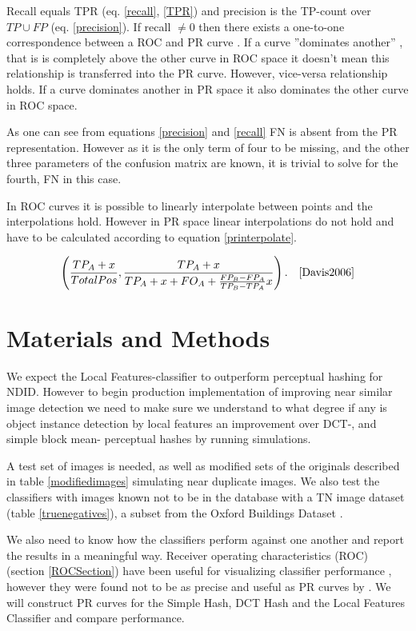 \documentclass[english,12pt,a4paper,pdftex,elec,utf8]{aaltothesis}
\begin{document}
Recall equals TPR (eq. \ref{recall}, \ref{TPR}) and precision is the TP-count over $TP \cup FP$ (eq. \ref{precision}). If recall $\neq 0$ then there exists a one-to-one correspondence between a ROC and PR curve \cite{Davis2006}. If a curve ''dominates another'' \cite{Provost1997}, that is is completely above the other curve in ROC space it doesn't mean this relationship is transferred into the PR curve. However, vice-versa relationship holds. If a curve dominates another in PR space it also dominates the other curve in ROC space. \cite{Davis2006}

As one can see from equations \ref{precision} and \ref{recall} FN is absent from the PR representation. However as it is the only term of four to be missing, and the other three parameters of the confusion matrix are known, it is trivial to solve for the fourth, FN in this case. \cite{Davis2006}

In ROC curves it is possible to linearly interpolate between points and the interpolations hold. However in PR space linear interpolations do not hold and have to be calculated according to equation \ref{printerpolate}. \cite{Davis2006}

\begin{equation}\label{printerpolate}
\left(\frac{TP_A+x}{Total Pos}, \frac{TP_A+x}{TP_A+x+FO_A+ \frac{FP_B-FP_A}{TP_B-TP_A}x} \right). \quad \cite{Davis2006}
\end{equation}

\clearpage

\section{Materials and Methods} \label{mame}
We expect the Local Features-classifier to outperform perceptual hashing for NDID. However to begin production implementation of improving near similar image detection we need to make sure we understand to what degree if any is object instance detection by local features an improvement over DCT-, and simple block mean- perceptual hashes by running simulations.

A test set of images is needed, as well as modified sets of the originals described in table \ref{modifiedimages} simulating near duplicate images. We also test the classifiers with images known not to be in the database with a TN image dataset (table \ref{truenegatives}), a subset from the Oxford Buildings Dataset \cite{PhilbinJamesArandjelovicReljaZisserman2012}.

We also need to know how the classifiers perform against one another and report the results in a meaningful way. Receiver operating characteristics (ROC) (section \ref{ROCSection}) have been useful for visualizing classifier performance \cite{Fawcett2006}, however they were found not to be as precise and useful as PR curves by \cite{Davis2006}. We will construct PR curves for the Simple Hash, DCT Hash and the Local Features Classifier and compare performance.
\end{document}
